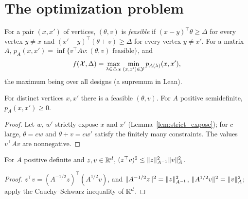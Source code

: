 \section{The optimization problem}

\begin{definition}
  \label{def:opt_value}
  \leanok
  For a pair $(x, x')$ of vertices, $(\theta, v)$ is \emph{feasible} if
  $(x - y)^\top \theta \ge \Delta$ for every vertex $y \ne x$ and $(x' - y)^\top (\theta + v) \ge
  \Delta$ for every vertex $y \ne x'$. For a matrix $A$, $p_A(x, x') = \inf\{v^\top A v : (\theta,
  v) \text{ feasible}\}$, and
  \[
    f(\mathcal{X}, \Delta) = \max_{\lambda \in \triangle_{\mathcal{X}}} \min_{(x, x') \in \mathcal{Y}} p_{A(\lambda)}(x, x'),
  \]
  the maximum being over all designs (a supremum in Lean).
\end{definition}

\begin{lemma}
  \label{lem:pair_feasible_nonempty}
  \leanok
  For distinct vertices $x, x'$ there is a feasible $(\theta, v)$. For $A$ positive semidefinite,
  $p_A(x, x') \ge 0$.
\end{lemma}

\begin{proof}
  \leanok
  Let $w$, $w'$ strictly expose $x$ and $x'$ (Lemma~\ref{lem:strict_expose}); for $c$ large,
  $\theta = c w$ and $\theta + v = c w'$ satisfy the finitely many constraints. The values
  $v^\top A v$ are nonnegative.
\end{proof}

\begin{lemma}
  \label{lem:mahalanobis_cauchy_schwarz}
  \leanok
  For $A$ positive definite and $z, v \in \mathbb{R}^d$, $(z^\top v)^2 \le \lVert z \rVert^2_{A^{-1}}
  \lVert v \rVert^2_A$.
\end{lemma}

\begin{proof}
  \leanok
  $z^\top v = (A^{-1/2} z)^\top (A^{1/2} v)$, and $\lVert A^{-1/2} z \rVert^2 = \lVert z \rVert^2_{A^{-1}}$,
  $\lVert A^{1/2} v \rVert^2 = \lVert v \rVert^2_A$; apply the Cauchy--Schwarz inequality of $\mathbb{R}^d$.
\end{proof}

